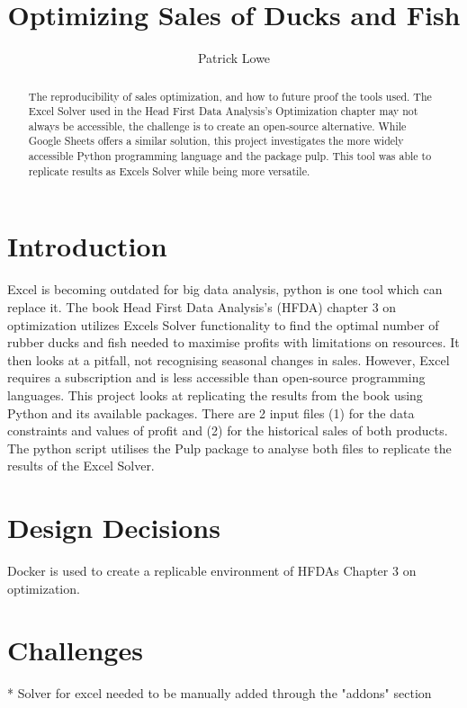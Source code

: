 \documentclass[acmtog]{acmart}
\begin{document}
\title{Optimizing Sales of Ducks and Fish}
\author{Patrick Lowe}

\begin{abstract}
The reproducibility of sales optimization, and how to future proof the tools used. The Excel Solver used in the Head First Data Analysis's Optimization chapter may not always be accessible, the challenge is to create an open-source alternative. While Google Sheets offers a similar solution, this project investigates the more widely accessible Python programming language and the package pulp. This tool was able to replicate results as Excels Solver while being more versatile.
\end{abstract}

\maketitle

\section{Introduction}
Excel is becoming outdated for big data analysis, python is one tool which can replace it. The book Head First Data Analysis's (HFDA) chapter 3 on optimization utilizes Excels Solver functionality to find the optimal number of rubber ducks and fish needed to maximise profits with limitations on resources. It then looks at a pitfall, not recognising seasonal changes in sales. However, Excel requires a subscription and is less accessible than open-source programming languages. This project looks at replicating the results from the book using Python and its available packages. There are 2 input files (1) for the data constraints and values of profit and (2) for the historical sales of both products. The python script utilises the Pulp package to analyse both files to replicate the results of the Excel Solver. 

\section{Design Decisions}
Docker is used to create a replicable environment of HFDAs Chapter 3 on optimization. 

\section{Challenges}
* Solver for excel needed to be manually added through the "addons" section
\end{document}

